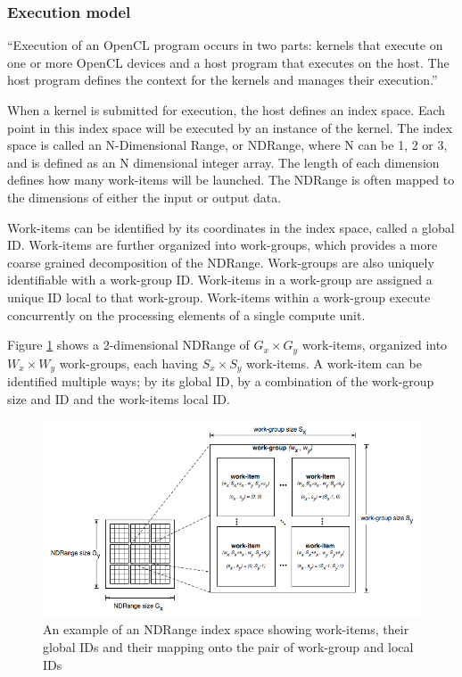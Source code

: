 \subsubsection{Execution model}

``Execution of an OpenCL program occurs in two parts: kernels that
execute on one or more OpenCL devices and a host program that executes
on the host. The host program defines the context for the kernels and
manages their execution.'' \cite{cl-spec}

When a kernel is submitted for execution, the host defines an index
space. Each point in this index space will be executed by an instance
of the kernel. The index space is called an N-Dimensional Range, or
NDRange, where N can be 1, 2 or 3, and is defined as an N dimensional
integer array. The length of each dimension defines how many
work-items will be launched. The NDRange is often mapped to the
dimensions of either the input or output data.

Work-items can be identified by its coordinates in the index space,
called a global ID. Work-items are further organized into work-groups,
which provides a more coarse grained decomposition of the NDRange.
Work-groups are also uniquely identifiable with a work-group ID.
Work-items in a work-group are assigned a unique ID local to that
work-group. Work-items within a work-group execute concurrently on the
processing elements of a single compute unit.

Figure \ref{execution-model-figure} shows a 2-dimensional NDRange of
$G_x \times G_y$ work-items, organized into $W_x \times W_y$
work-groups, each having $S_x \times S_y$ work-items. A work-item can
be identified multiple ways; by its global ID, by a combination of the
work-group size and ID and the work-items local ID.

\begin{figure}[h]
  \includegraphics[width=\textwidth]{images/execution-model.png}
  \caption{An example of an NDRange index space showing work-items,
    their global IDs and their mapping onto the pair of work-group and
    local IDs}
  \label{execution-model-figure}
\end{figure}



